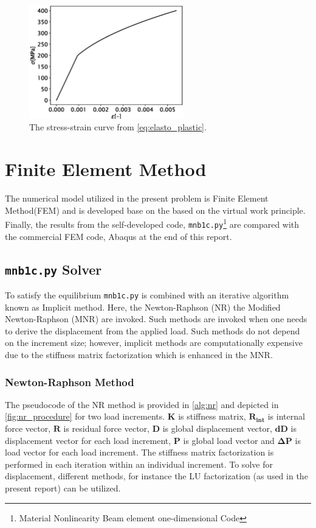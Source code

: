 \documentclass{article}
\begin{document}
\begin{figure}[H]
    \centering
    \includegraphics[width = 0.6\textwidth ]{figures/stress_strain.eps}
    \caption{The stress-strain curve from \cref{eq:elasto_plastic}.}
    \label{fig:stress_strain}
\end{figure}

\section{Finite Element Method}
The numerical model utilized in the present problem is Finite Element Method(FEM) and is developed base on the based on the virtual work principle. Finally, the results from the self-developed code, \texttt{mnb1c.py}\footnote{Material Nonlinearity Beam element one-dimensional Code} are compared with the commercial FEM code, Abaqus at the end of this report. 

\subsection{\texttt{mnb1c.py} Solver}
To satisfy the equilibrium \texttt{mnb1c.py} is combined with an iterative algorithm known as Implicit method. Here, the Newton-Raphson (NR) the Modified Newton-Raphson (MNR) are invoked. Such methods are invoked when one needs to derive the displacement from the applied load. Such methods do not depend on the increment size; however, implicit methods are computationally expensive due to the stiffness matrix factorization which is enhanced in the MNR.

\subsubsection{Newton-Raphson Method}
The pseudocode of the NR method is provided in \cref{alg:nr} and depicted in \cref{fig:nr_procedure} for two load increments. $\boldsymbol{K}$ is stiffness matrix, $\boldsymbol{R_{int}}$ is internal force vector, $\boldsymbol{R}$ is residual force vector, $\boldsymbol{D}$ is global displacement vector, $\boldsymbol{dD}$ is displacement vector for each load increment, $\boldsymbol{P}$ is global load vector and $\boldsymbol{\Delta P}$ is load vector for each load increment. The stiffness matrix factorization is performed in each iteration within an individual increment. To solve for displacement, different methods, for instance the LU factorization (as used in the present report) can be utilized.
\end{document}
